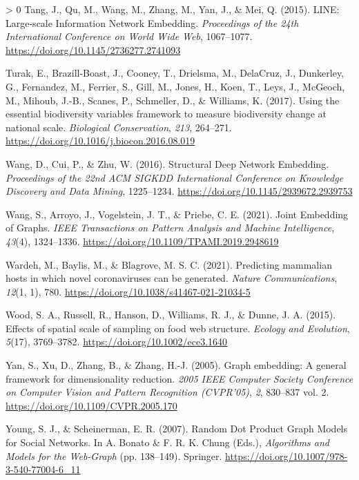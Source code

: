 \documentclass[10pt,oneside]{article}
\newlength{\cslhangindent}
\newenvironment{CSLReferences}[3] %
 {%
  \setlength{\parindent}{0pt}
  \ifodd #1 \everypar{\setlength{\hangindent}{\cslhangindent}}\ignorespaces\fi
  \ifnum #2 > 0
  \setlength{\parskip}{#2\baselineskip}
  \fi
 }%
 {}
\begin{document}
\begin{CSLReferences}{1}{0}
\leavevmode\hypertarget{ref-Tang2015LinLar}{}%
Tang, J., Qu, M., Wang, M., Zhang, M., Yan, J., \& Mei, Q. (2015). LINE:
Large-scale Information Network Embedding. \emph{Proceedings of the 24th
International Conference on World Wide Web}, 1067--1077.
\url{https://doi.org/10.1145/2736277.2741093}

\leavevmode\hypertarget{ref-Turak2017UsiEss}{}%
Turak, E., Brazill-Boast, J., Cooney, T., Drielsma, M., DelaCruz, J.,
Dunkerley, G., Fernandez, M., Ferrier, S., Gill, M., Jones, H., Koen,
T., Leys, J., McGeoch, M., Mihoub, J.-B., Scanes, P., Schmeller, D., \&
Williams, K. (2017). Using the essential biodiversity variables
framework to measure biodiversity change at national scale.
\emph{Biological Conservation}, \emph{213}, 264--271.
\url{https://doi.org/10.1016/j.biocon.2016.08.019}

\leavevmode\hypertarget{ref-Wang2016StrDee}{}%
Wang, D., Cui, P., \& Zhu, W. (2016). Structural Deep Network Embedding.
\emph{Proceedings of the 22nd ACM SIGKDD International Conference on
Knowledge Discovery and Data Mining}, 1225--1234.
\url{https://doi.org/10.1145/2939672.2939753}

\leavevmode\hypertarget{ref-Wang2021JoiEmb}{}%
Wang, S., Arroyo, J., Vogelstein, J. T., \& Priebe, C. E. (2021). Joint
Embedding of Graphs. \emph{IEEE Transactions on Pattern Analysis and
Machine Intelligence}, \emph{43}(4), 1324--1336.
\url{https://doi.org/10.1109/TPAMI.2019.2948619}

\leavevmode\hypertarget{ref-Wardeh2021PreMam}{}%
Wardeh, M., Baylis, M., \& Blagrove, M. S. C. (2021). Predicting
mammalian hosts in which novel coronaviruses can be generated.
\emph{Nature Communications}, \emph{12}(1, 1), 780.
\url{https://doi.org/10.1038/s41467-021-21034-5}

\leavevmode\hypertarget{ref-Wood2015EffSpa}{}%
Wood, S. A., Russell, R., Hanson, D., Williams, R. J., \& Dunne, J. A.
(2015). Effects of spatial scale of sampling on food web structure.
\emph{Ecology and Evolution}, \emph{5}(17), 3769--3782.
\url{https://doi.org/10.1002/ece3.1640}

\leavevmode\hypertarget{ref-Yan2005GraEmb}{}%
Yan, S., Xu, D., Zhang, B., \& Zhang, H.-J. (2005). Graph embedding: A
general framework for dimensionality reduction. \emph{2005 IEEE Computer
Society Conference on Computer Vision and Pattern Recognition
(CVPR'05)}, \emph{2}, 830--837 vol. 2.
\url{https://doi.org/10.1109/CVPR.2005.170}

\leavevmode\hypertarget{ref-Young2007RanDot}{}%
Young, S. J., \& Scheinerman, E. R. (2007). Random Dot Product Graph
Models for Social Networks. In A. Bonato \& F. R. K. Chung (Eds.),
\emph{Algorithms and Models for the Web-Graph} (pp. 138--149). Springer.
\url{https://doi.org/10.1007/978-3-540-77004-6_11}

\end{CSLReferences}
\end{document}
